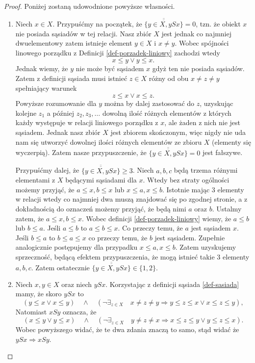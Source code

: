 \documentclass[12pt,a4paper]{report}
\newcommand{\licznosc}[1]{\overline{\overline{#1}}}
\begin{document}
\begin{proof}
Poniżej zostaną udowodnione powyższe własności.
\begin{enumerate}
\item Niech $x \in X$. Przypuśćmy na początek, że $\licznosc{\{y \in X, ySx\}} = 0$, tzn. że obiekt $x$ nie posiada sąsiadów w tej relacji. Nasz zbiór $X$ jest jednak co najmniej dwuelementowy zatem istnieje element $y \in X$ i $ x \neq y$. Wobec spójności linowego porządku z Definicji \ref{def-porzadek-liniowy} zachodzi wtedy
$$ x \leq y \lor y \leq x.$$
Jednak wiemy, że $y$ nie może być sąsiadem $x$ gdyż ten nie posiada sąsiadów. Zatem z definicji sąsiada musi istnieć $z \in X$ różny od obu $x \neq z \neq y$ spełniający warunek
$$
z \leq x \lor x \leq z.
$$
Powyższe rozumowanie dla $y$ można by dalej zastosować do $z$, uzyskując kolejne $z_1$ a później $z_2,z_3, \ldots$ dowolną ilość różnych elementów z których każdy występuje w relacji liniowego porządku z $x$, ale żaden z nich nie jest sąsiadem. Jednak nasz zbiór $X$ jest zbiorem skończonym, więc nigdy nie uda nam się utworzyć dowolnej ilości różnych elementów ze zbioru $X$ (elementy się wyczerpią). Zatem nasze przypuszczenie, że $\licznosc{\{y \in X, ySx\}} = 0$ jest fałszywe.

Przypuśćmy dalej, że $\licznosc{\{y \in X, ySx\}} \geq 3$. Niech $a,b,c$ będą trzema różnymi elementami z $X$ będącymi sąsiadami dla $x$. Wtedy bez straty ogólności możemy przyjąć, że $a \leq x, b \leq x$ lub $x \leq a, x \leq b$. Istotnie mając 3 elementy w relacji wtedy co najmniej dwa muszą znajdować się po zgodnej stronie, a z dokładnością do oznaczeń możemy przyjąć, że będą nimi $a$ oraz $b$. Ustalmy zatem, że $a \leq x, b \leq x$. Wobec definicji \ref{def-porzadek-liniowy} wiemy, że $a \leq b$ lub $b \leq a$. Jeśli $a \leq b$ to $a \leq b \leq x$. Co przeczy temu, że $a$ jest sąsiadem $x$. Jeśli $b \leq a$ to $b \leq a \leq x$ co przeczy temu, że $b$ jest sąsiadem. Zupełnie analogicznie postępujemy dla przypadku $x \leq a, x \leq b$. Zatem uzyskujemy sprzeczność, będącą efektem przypuszczenia, że mogą istnieć takie 3 elementy $a,b,c$. Zatem ostatecznie $\licznosc{\{y \in X, ySx\}} \in \{ 1,2 \}$.

\item Niech $x,y \in X$ oraz niech $ySx$. Korzystając z definicji sąsiada \ref{def-sasiada} mamy, że skoro $ySx$ to  $$\left(y \leq x \lor x\leq y \right)\quad \land \quad  \left(\lnot \exists_{z \in X}  \quad x\neq z \neq y \Rightarrow   y \leq z \leq x \lor x \leq z \leq y \right),$$ Natomiast $xSy$ oznacza, że $$\left(x \leq y \lor y\leq x \right)\quad \land \quad  \left(\lnot \exists_{z \in X}  \quad y\neq z \neq x \Rightarrow   x \leq z \leq y \lor y \leq z \leq x \right).$$ 
Wobec powyższego widać, że te dwa zdania znaczą to samo, stąd widać że  $ySx \Rightarrow xSy$. %


\end{enumerate}
\end{proof}
\end{document}
